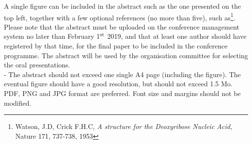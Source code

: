 \documentclass[a4,fullpage,twoside,12pt]{report}
\begin{document}
A single figure can be included in the abstract such as the one 
presented on the top left, together with a few optional references (no more than five), such as\footnote{%
Watson, J.D, Crick F.H.C, \emph{A structure for the Deoxyribose Nucleic Acid}, Nature 171, 737-738, 1953}.  
Please note that the abstract must be uploaded on the conference management
system no later than February 1$^{\mbox{\scriptsize st}}$ 2019, and that at least one author should have registered by that time,
for the final paper to be included in the conference programme. The abstract will be used by the organisation committee 
for selecting the oral presentations. \\

 - The abstract should not exceed one single A4 page (including the figure).
The eventual figure should have a good resolution, but should not exceed 1.5 Mo. PDF, PNG and
JPG format are preferred. Font size and margins should not be modified.\\

\vfill

\pagebreak
\newpage
\end{document}
